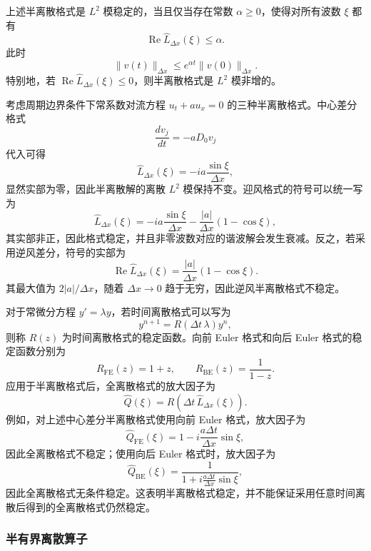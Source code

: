 \begin{theorem}
    上述半离散格式是 $L^2$ 模稳定的，当且仅当存在常数 $\alpha\ge 0$，使得对所有波数 $\xi$ 都有
    \[
        \operatorname{Re}\widehat L_{\Delta x}(\xi)\le\alpha.
    \]
    此时
    \[
        \|v(t)\|_{\Delta x}\le e^{\alpha t}\|v(0)\|_{\Delta x}.
    \]
    特别地，若 $\operatorname{Re}\widehat L_{\Delta x}(\xi)\le0$，则半离散格式是 $L^2$ 模非增的。
\end{theorem}

\begin{example}
    考虑周期边界条件下常系数对流方程 $u_t+a u_x=0$ 的三种半离散格式。中心差分格式
    \[
        \frac{dv_j}{dt}=-aD_0v_j
    \]
    代入可得
    \[
        \widehat L_{\Delta x}(\xi)=-i a\frac{\sin\xi}{\Delta x},
    \]
    显然实部为零，因此半离散解的离散 $L^2$ 模保持不变。迎风格式的符号可以统一写为
    \[
        \widehat L_{\Delta x}(\xi)
        =-i a\frac{\sin\xi}{\Delta x}
        -\frac{|a|}{\Delta x}(1-\cos\xi),
    \]
    其实部非正，因此格式稳定，并且非零波数对应的谐波解会发生衰减。反之，若采用逆风差分，符号的实部为
    \[
        \operatorname{Re}\widehat L_{\Delta x}(\xi)
        =\frac{|a|}{\Delta x}(1-\cos\xi).
    \]
    其最大值为 $2|a|/\Delta x$，随着 $\Delta x\to0$ 趋于无穷，因此逆风半离散格式不稳定。
\end{example}

\begin{remark}
    对于常微分方程 $y'=\lambda y$，若时间离散格式可以写为
    \[
        y^{n+1}=R(\Delta t\,\lambda)y^n,
    \]
    则称 $R(z)$ 为时间离散格式的稳定函数。向前 Euler 格式和向后 Euler 格式的稳定函数分别为
    \[
        R_{\mathrm{FE}}(z)=1+z,
        \qquad
        R_{\mathrm{BE}}(z)=\frac{1}{1-z}.
    \]
    应用于半离散格式后，全离散格式的放大因子为
    \[
        \widehat Q(\xi)
        =R\!\left(\Delta t\,\widehat L_{\Delta x}(\xi)\right).
    \]
    例如，对上述中心差分半离散格式使用向前 Euler 格式，放大因子为
    \[
        \widehat Q_{\mathrm{FE}}(\xi)
        =1-i\frac{a\Delta t}{\Delta x}\sin\xi,
    \]
    因此全离散格式不稳定；使用向后 Euler 格式时，放大因子为
    \[
        \widehat Q_{\mathrm{BE}}(\xi)
        =\frac{1}{1+i\frac{a\Delta t}{\Delta x}\sin\xi},
    \]
    因此全离散格式无条件稳定。这表明半离散格式稳定，并不能保证采用任意时间离散后得到的全离散格式仍然稳定。
\end{remark}

\subsubsection{半有界离散算子}

